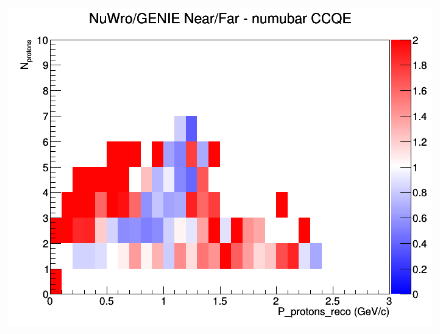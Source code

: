 \documentclass[12pt]{article}
\begin{document}
\begin{figure}[h]
\endminipage
{}
\includegraphics[width=\linewidth]{eff_N_P/FGT/protons/ratios/CCQE_NuWro_GENIE_numubar_NF_N_P.png}
\endminipage
\newline
\end{figure}
\clearpage
\end{document}
